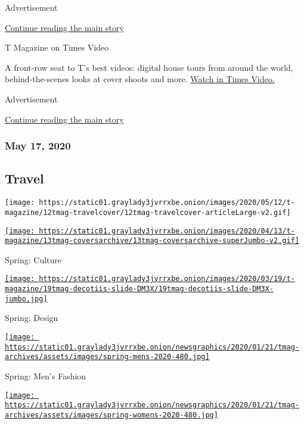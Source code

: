 Advertisement

\protect\hyperlink{after-mid2}{Continue reading the main story}

T Magazine on Times Video

A front-row seat to T's best videos: digital house tours from around the
world, behind-the-scenes looks at cover shoots and more.
\href{https://www.nytimes3xbfgragh.onion/video/t-magazine}{Watch in
Times Video.}

Advertisement

\protect\hyperlink{after-mktg}{Continue reading the main story}

\hypertarget{may-17-2020}{%
\subsubsection{May 17, 2020}\label{may-17-2020}}

\href{https://www.nytimes3xbfgragh.onion/issue/t-magazine/2020/05/02/ts-may-17-travel-issue}{}

\hypertarget{travel}{%
\subsection{Travel}\label{travel}}

\texttt{[image: https://static01.graylady3jvrrxbe.onion/images/2020/05/12/t-magazine/12tmag-travelcover/12tmag-travelcover-articleLarge-v2.gif]}

\href{https://www.nytimes3xbfgragh.onion/issue/t-magazine/2020/04/12/ts-april-19-culture-issue}{\texttt{[image: https://static01.graylady3jvrrxbe.onion/images/2020/04/13/t-magazine/13tmag-coversarchive/13tmag-coversarchive-superJumbo-v2.gif]}}

Spring: Culture

\href{https://www.nytimes3xbfgragh.onion/issue/t-magazine/2020/03/06/ts-march-22-design-issue}{\texttt{[image: https://static01.graylady3jvrrxbe.onion/images/2020/03/19/t-magazine/19tmag-decotiis-slide-DM3X/19tmag-decotiis-slide-DM3X-jumbo.jpg]}}

Spring: Design

\href{https://www.nytimes3xbfgragh.onion/issue/t-magazine/2020/02/21/ts-march-8-mens-fashion-issue}{\texttt{[image: https://static01.graylady3jvrrxbe.onion/newsgraphics/2020/01/21/tmag-archives/assets/images/spring-mens-2020-480.jpg]}}

Spring: Men's Fashion

\href{https://www.nytimes3xbfgragh.onion/issue/t-magazine/2020/02/06/ts-feb-23-womens-fashion-issue}{\texttt{[image: https://static01.graylady3jvrrxbe.onion/newsgraphics/2020/01/21/tmag-archives/assets/images/spring-womens-2020-480.jpg]}}

